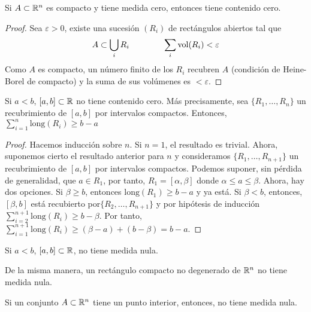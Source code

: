 \begin{prop}
    Si $A \subset \mathbb{R}^n$ es compacto y tiene medida cero, entonces tiene contenido
    cero.
\end{prop}
\begin{proof}
    Sea $\varepsilon > 0$, existe una sucesión $(R_i)$ de rectángulos abiertos tal
    que
    \[
        A \subset \bigcup_i R_i \qquad \qquad \sum_i \operatorname{vol}(R_i) < \varepsilon
    \]
    Como $A$ es compacto, un número finito de los $R_i$ recubren $A$ (condición
    de Heine-Borel de compacto) y la suma de sus volúmenes es $< \varepsilon$.
\end{proof}

\begin{lema}
    Si $a < b$, $[a,b] \subset \mathbb{R}$ no tiene contenido cero. Más precisamente,
    sea $\{R_1,\dots,R_n\}$ un recubrimiento de $[a,b]$ por intervalos compactos.
    Entonces, $\sum\limits^{n}_{i=1} \text{long}(R_i) \geq b-a$
\end{lema}
\begin{proof}
    Hacemos inducción sobre $n$. Si $n = 1$, el resultado es trivial. Ahora,
    suponemos cierto el resultado anterior para $n$ y consideramos
    $\{R_1,\dots,R_{n+1}\}$ un recubrimiento de $[a,b]$ por intervalos compactos.
    Podemos suponer, sin p\'erdida de generalidad, que $a \in R_1$, por tanto,
    $R_1 = [\alpha,\beta]$ donde $\alpha \leq a \leq \beta$. Ahora, hay dos
    opciones. Si $\beta \geq b$, entonces $\text{long}(R_1) \geq b - a$ y ya está.
    Si $\beta< b$, entonces, $[\beta,b]$ está recubierto por$\{R_2,\dots,R_{n+1}\}$
    y por hipótesis de inducción $\sum\limits^{n+1}_{i=2} \text{long}(R_i) \geq
    b - \beta$. Por tanto, $\sum\limits^{n+1}_{i=1} \text{long}(R_i) \geq
    (\beta - a) + (b - \beta) = b - a$.
\end{proof}
\begin{col*}
    Si $a < b$, $[a,b]\subset \mathbb{R}$, no tiene medida nula.
\end{col*}
\begin{obs}
    De la misma manera, un rectángulo compacto no degenerado de $\mathbb{R}^n$ no
    tiene medida nula.
\end{obs}
\begin{col*}
    Si un conjunto $A \subset \mathbb{R}^n$ tiene un punto interior, entonces, no tiene
    medida nula.
\end{col*}

